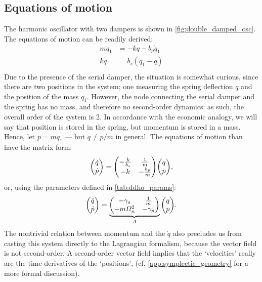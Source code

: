\subsection{Equations of motion}
The harmonic oscillator with two dampers is shown in \cref{fig:double_damped_osc}. The equations of motion can be readily derived:
\begin{equation}
    \begin{split}
        m\ddot{q}_1 &= -kq - b_p \dot{q}_1 \\
        kq &= b_s(\dot{q}_1 - \dot{q}) \\
    \end{split}
\end{equation}
Due to the presence of the serial damper, the situation is somewhat curious, since there are two positions in the system; one measuring the spring deflection $q$ and the position of the mass $q_1$. However, the node connecting the serial damper and the spring has no mass, and therefore no second-order dynamics: as such, the overall order of the system is 2. In accordance with the economic analogy, we will say that position is stored in the spring, but momentum is stored in a mass. Hence, let $p = m\dot{q}_1$ --- but $\dot{q} \neq p/m$ in general. The equations of motion than have the matrix form:
\begin{equation*}
    \mqty(\dot{q}\\\dot{p}) = \mqty(-\tfrac{k}{b_s} & \tfrac{1}{m} \\ -k & - \tfrac{b_p}{m})\mqty(q \\ p),
\end{equation*}
or, using the parameters defined in \cref{tab:ddho_params}:
\begin{equation}
    \mqty(\dot{q}\\\dot{p}) = \underbrace{\mqty(-\gamma_s & \frac{1}{m} \\ -m\Omega_n^2 & - \gamma_p)}_A \mqty(q \\ p).
    \label{eq:ddho_eom}
\end{equation}
The nontrivial relation between momentum and the $\dot{q}$ also precludes us from casting this system directly to the Lagrangian formalism, because the vector field is not second-order. A second-order vector field implies that the `velocities' really are the time derivatives of the `positions', (cf. \cref{app:symplectic_geometry} for a more formal discussion).

